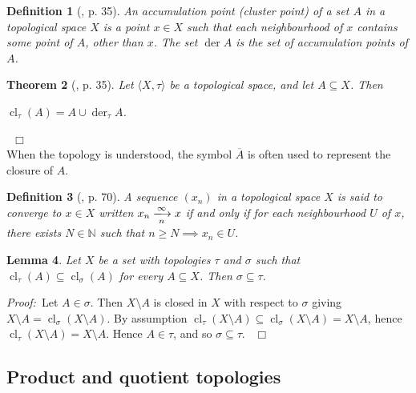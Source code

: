 \documentclass[12pt, oneside]{book}
\newtheorem{theorem}{Theorem}[subsection]
\newtheorem{lemma}[theorem]{Lemma}
\newtheorem{proposition}[theorem]{Proposition}
\newtheorem{definition}[theorem]{Definition}
\newcommand{\proof}{{\noindent \it Proof:~}}
\newcommand{\qed}{\hfill ~$\Box$\\}
\def\cl{\operatorname{cl}}
\def\der{\operatorname{der}}
\begin{document}
\begin{definition}[\cite{W2}, p. 35] \label{dfnClusterPoint}
\normalfont
\noindent
An {\sl accumulation point (cluster point)} of a set $A$ in a topological space $X$ is a point 
$x \in X$ such that each neighbourhood of $x$ contains some point of $A$, other than $x$. The set $\der A$ is the set of accumulation points of $A$.
\end{definition}
\begin{theorem} [\cite{W2}, p. 35] \label{ClosureITODerivedSet}
\normalfont
\noindent Let $\langle X, \tau \rangle$ be a topological space, and let $A \subseteq X$. Then 
\begin{center}
$\cl_{\tau}(A) = A \cup \der_{\tau} A$. 
\end{center}
\end{theorem}
\qed
\noindent When the topology is understood, the symbol $\overline{A}$ is often used to 
represent the closure of $A$.
\begin{definition}[\cite{W2}, p. 70]
\normalfont
\noindent A sequence $(x_n)$ in a topological space $X$ is said to {\sl converge} to $x \in X$ 
written $x_n \xlongrightarrow[n]{\infty} x$ if and only if for each neighbourhood $U$
of $x$, there exists $N \in \mathbb{N}$ such that $n \geq N \implies x_n \in U$.
\end{definition}

\begin{lemma} \label{2TopologiesOnOneSet}
\normalfont
Let $X$ be a set with topologies $\tau$ and $\sigma$ such that $\cl_{\tau}(A) \subseteq \cl_{\sigma}(A)$ for every $A \subseteq X$. Then $\sigma \subseteq \tau$.

\end{lemma}

\proof \space Let $A \in \sigma$. Then $X \setminus A$ is closed in $X$ with respect to $\sigma$ 
giving $X \setminus A = \cl_{\sigma}(X \setminus A)$. 
By assumption $\cl_{\tau}(X \setminus A) \subseteq \cl_{\sigma}(X \setminus A)= X \setminus A$, 
hence $\cl_{\tau}(X \setminus A)=X \setminus A$. 
Hence $A \in \tau$, and so $\sigma \subseteq \tau$. \qed

\subsection{Product and quotient topologies}
\end{document}
